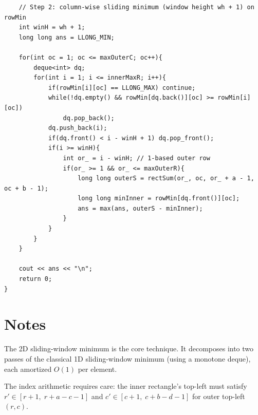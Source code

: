\documentclass[11pt,a4paper]{article}
\begin{document}
\begin{lstlisting}
    // Step 2: column-wise sliding minimum (window height wh + 1) on rowMin
    int winH = wh + 1;
    long long ans = LLONG_MIN;

    for(int oc = 1; oc <= maxOuterC; oc++){
        deque<int> dq;
        for(int i = 1; i <= innerMaxR; i++){
            if(rowMin[i][oc] == LLONG_MAX) continue;
            while(!dq.empty() && rowMin[dq.back()][oc] >= rowMin[i][oc])
                dq.pop_back();
            dq.push_back(i);
            if(dq.front() < i - winH + 1) dq.pop_front();
            if(i >= winH){
                int or_ = i - winH; // 1-based outer row
                if(or_ >= 1 && or_ <= maxOuterR){
                    long long outerS = rectSum(or_, oc, or_ + a - 1, oc + b - 1);
                    long long minInner = rowMin[dq.front()][oc];
                    ans = max(ans, outerS - minInner);
                }
            }
        }
    }

    cout << ans << "\n";
    return 0;
}
\end{lstlisting}

\section{Notes}
The 2D sliding-window minimum is the core technique. It decomposes into two passes of the classical 1D sliding-window minimum (using a monotone deque), each amortized $O(1)$ per element.

The index arithmetic requires care: the inner rectangle's top-left must satisfy $r' \in [r+1,\; r + a - c - 1]$ and $c' \in [c+1,\; c + b - d - 1]$ for outer top-left $(r, c)$.
\end{document}
